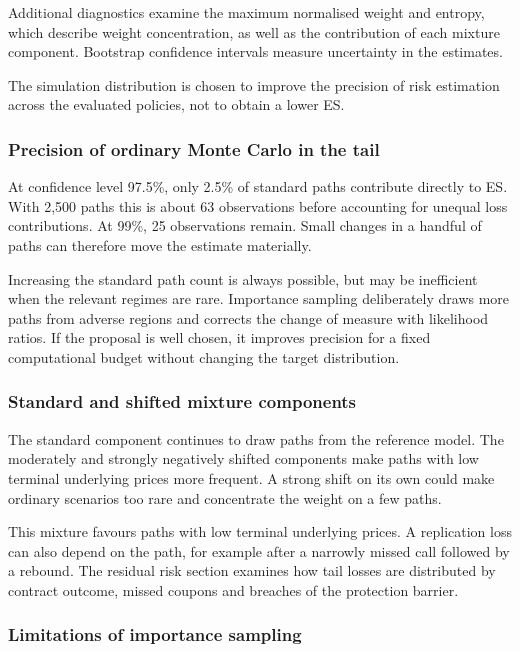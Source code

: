 \documentclass[12pt,a4paper]{article}
\newcommand{\1}{\mathbf{1}}
\begin{document}
Additional diagnostics examine the maximum normalised weight and entropy, which describe weight concentration, as well as the contribution of each mixture component. Bootstrap confidence intervals measure uncertainty in the estimates.

The simulation distribution is chosen to improve the precision of risk estimation across the evaluated policies, not to obtain a lower ES.

\subsubsection*{Precision of ordinary Monte Carlo in the tail}

At confidence level 97.5\%, only 2.5\% of standard paths contribute directly
to ES. With 2,500 paths this is about 63 observations before accounting
for unequal loss contributions. At 99\%, 25 observations remain.
Small changes in a handful of paths can therefore move the estimate
materially.

Increasing the standard path count is always possible, but may be inefficient
when the relevant regimes are rare. Importance sampling deliberately draws
more paths from adverse regions and corrects the change of measure with
likelihood ratios. If the proposal is well chosen, it improves precision for a
fixed computational budget without changing the target distribution.

\subsubsection*{Standard and shifted mixture components}

The standard component continues to draw paths from the reference model. The moderately and strongly negatively shifted components make paths with low terminal underlying prices more frequent. A strong shift on its own could make ordinary scenarios too rare and concentrate the weight on a few paths.

This mixture favours paths with low terminal underlying prices. A replication loss can also depend on the path, for example after a narrowly missed call followed by a rebound. The residual risk section examines how tail losses are distributed by contract outcome, missed coupons and breaches of the protection barrier.

\subsubsection*{Limitations of importance sampling}
\end{document}

